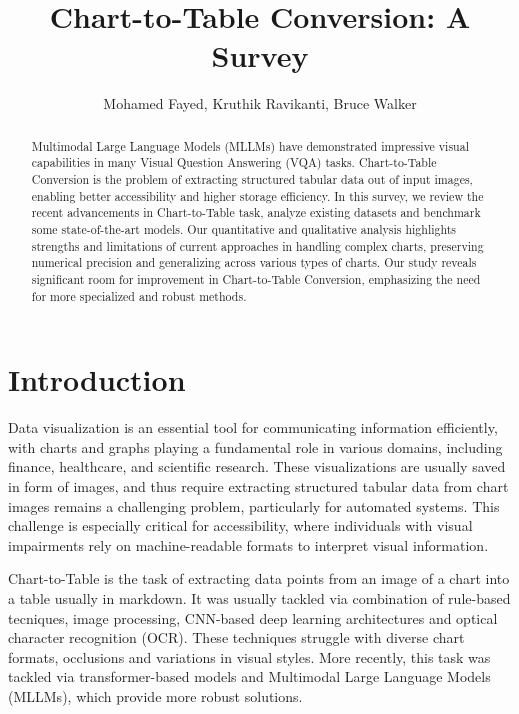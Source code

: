 \documentclass[
	letterpaper, %
]{jdf}
\author{Mohamed Fayed, Kruthik Ravikanti, Bruce Walker}
\title{Chart-to-Table Conversion: A Survey}
\begin{document}

\maketitle

\begin{abstract}
    Multimodal   Large Language Models (MLLMs) have demonstrated impressive visual capabilities in many Visual Question Answering (VQA) tasks.
    Chart-to-Table Conversion is the problem of extracting structured tabular data out of input images, enabling better accessibility and higher storage efficiency.
In this survey, we review the recent advancements in Chart-to-Table task, analyze existing datasets and benchmark some state-of-the-art models.
Our quantitative and qualitative analysis highlights strengths and limitations of current approaches in handling complex charts, preserving numerical precision and generalizing across various types of charts.
Our study reveals significant room for improvement in Chart-to-Table Conversion, emphasizing the need for more specialized and robust methods.
   \end{abstract}

   \tableofcontents

\section{Introduction}\label{sect:intro}
Data visualization is an essential tool for communicating information efficiently, with charts and graphs playing a fundamental role in various domains, including finance, healthcare, and scientific research.
These visualizations are usually saved in form of images, and thus require extracting structured tabular data from chart images remains a challenging problem, particularly for automated systems.
This challenge is especially critical for accessibility, where individuals with visual impairments rely on machine-readable formats to interpret visual information.

Chart-to-Table is the task of extracting data points from an image of a chart into a table usually in markdown\cite{liu2022deplot,masry2024chartgemma}.
It was usually tackled via combination of rule-based tecniques, image processing, CNN-based deep learning architectures and optical character recognition (OCR).
These techniques struggle with diverse chart formats, occlusions and variations in visual styles.
More recently, this task was tackled via transformer-based models and Multimodal Large Language Models (MLLMs), which provide more robust solutions.
\end{document}
